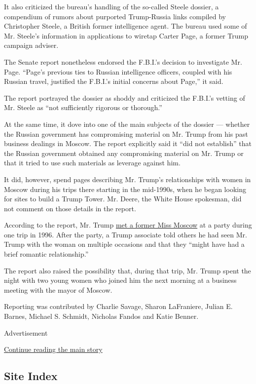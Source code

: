 It also criticized the bureau's handling of the so-called Steele
dossier, a compendium of rumors about purported Trump-Russia links
compiled by Christopher Steele, a British former intelligence agent. The
bureau used some of Mr. Steele's information in applications to wiretap
Carter Page, a former Trump campaign adviser.

The Senate report nonetheless endorsed the F.B.I.'s decision to
investigate Mr. Page. ``Page's previous ties to Russian intelligence
officers, coupled with his Russian travel, justified the F.B.I.'s
initial concerns about Page,'' it said.

The report portrayed the dossier as shoddy and criticized the F.B.I.'s
vetting of Mr. Steele as ``not sufficiently rigorous or thorough.''

At the same time, it dove into one of the main subjects of the dossier
--- whether the Russian government has compromising material on Mr.
Trump from his past business dealings in Moscow. The report explicitly
said it ``did not establish'' that the Russian government obtained any
compromising material on Mr. Trump or that it tried to use such
materials as leverage against him.

It did, however, spend pages describing Mr. Trump's relationships with
women in Moscow during his trips there starting in the mid-1990s, when
he began looking for sites to build a Trump Tower. Mr. Deere, the White
House spokesman, did not comment on those details in the report.

According to the report, Mr. Trump
\href{https://www.nytimes3xbfgragh.onion/2020/08/18/us/politics/trump-russia-senate-intelligence.html}{met
a former Miss Moscow} at a party during one trip in 1996. After the
party, a Trump associate told others he had seen Mr. Trump with the
woman on multiple occasions and that they ``might have had a brief
romantic relationship.''

The report also raised the possibility that, during that trip, Mr. Trump
spent the night with two young women who joined him the next morning at
a business meeting with the mayor of Moscow.

Reporting was contributed by Charlie Savage, Sharon LaFraniere, Julian
E. Barnes, Michael S. Schmidt, Nicholas Fandos and Katie Benner.

Advertisement

\protect\hyperlink{after-bottom}{Continue reading the main story}

\hypertarget{site-index}{%
\subsection{Site Index}\label{site-index}}

